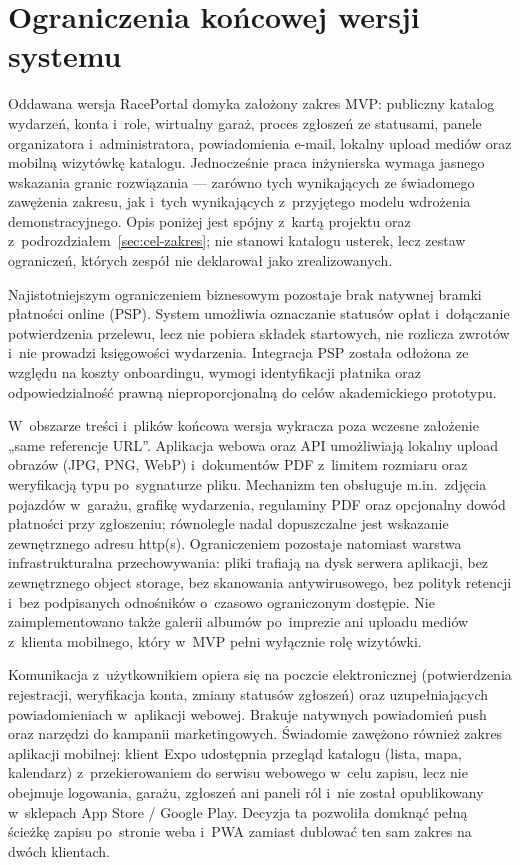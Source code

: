 \documentclass{sprz}
\begin{document}
\section{Ograniczenia końcowej wersji systemu}
Oddawana wersja RacePortal domyka założony zakres MVP: publiczny katalog wydarzeń, konta i~role, wirtualny garaż, proces zgłoszeń ze statusami, panele organizatora i~administratora, powiadomienia e-mail, lokalny upload mediów oraz mobilną wizytówkę katalogu. Jednocześnie praca inżynierska wymaga jasnego wskazania granic rozwiązania --- zarówno tych wynikających ze świadomego zawężenia zakresu, jak i~tych wynikających z~przyjętego modelu wdrożenia demonstracyjnego. Opis poniżej jest spójny z~kartą projektu oraz z~podrozdziałem~\ref{sec:cel-zakres}; nie stanowi katalogu usterek, lecz zestaw ograniczeń, których zespół nie deklarował jako zrealizowanych.

Najistotniejszym ograniczeniem biznesowym pozostaje brak natywnej bramki płatności online (PSP). System umożliwia oznaczanie statusów opłat i~dołączanie potwierdzenia przelewu, lecz nie pobiera składek startowych, nie rozlicza zwrotów i~nie prowadzi księgowości wydarzenia. Integracja PSP została odłożona ze względu na koszty onboardingu, wymogi identyfikacji płatnika oraz odpowiedzialność prawną nieproporcjonalną do celów akademickiego prototypu.

W~obszarze treści i~plików końcowa wersja wykracza poza wczesne założenie „same referencje URL”. Aplikacja webowa oraz API umożliwiają lokalny upload obrazów (JPG, PNG, WebP) i~dokumentów PDF z~limitem rozmiaru oraz weryfikacją typu po~sygnaturze pliku. Mechanizm ten obsługuje m.in.\ zdjęcia pojazdów w~garażu, grafikę wydarzenia, regulaminy PDF oraz opcjonalny dowód płatności przy zgłoszeniu; równolegle nadal dopuszczalne jest wskazanie zewnętrznego adresu http(s). Ograniczeniem pozostaje natomiast warstwa infrastrukturalna przechowywania: pliki trafiają na dysk serwera aplikacji, bez zewnętrznego object storage, bez skanowania antywirusowego, bez polityk retencji i~bez podpisanych odnośników o~czasowo ograniczonym dostępie. Nie zaimplementowano także galerii albumów po~imprezie ani uploadu mediów z~klienta mobilnego, który w~MVP pełni wyłącznie rolę wizytówki.

Komunikacja z~użytkownikiem opiera się na poczcie elektronicznej (potwierdzenia rejestracji, weryfikacja konta, zmiany statusów zgłoszeń) oraz uzupełniających powiadomieniach w~aplikacji webowej. Brakuje natywnych powiadomień push oraz narzędzi do kampanii marketingowych. Świadomie zawężono również zakres aplikacji mobilnej: klient Expo udostępnia przegląd katalogu (lista, mapa, kalendarz) z~przekierowaniem do serwisu webowego w~celu zapisu, lecz nie obejmuje logowania, garażu, zgłoszeń ani paneli ról i~nie został opublikowany w~sklepach App Store / Google Play. Decyzja ta pozwoliła domknąć pełną ścieżkę zapisu po~stronie weba i~PWA zamiast dublować ten sam zakres na dwóch klientach.
\end{document}
